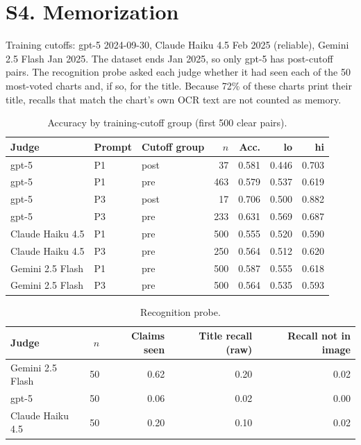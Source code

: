 \documentclass[10pt]{article}
\begin{document}
\section*{S4. Memorization}
Training cutoffs: gpt-5 2024-09-30, Claude Haiku 4.5 Feb 2025 (reliable), Gemini 2.5 Flash Jan 2025. The dataset ends Jan 2025, so only gpt-5 has post-cutoff pairs. The recognition probe asked each judge whether it had seen each of the 50 most-voted charts and, if so, for the title. Because 72\% of these charts print their title, recalls that match the chart's own OCR text are not counted as memory.

\begin{table}[h]\centering\small
\caption{Accuracy by training-cutoff group (first 500 clear pairs).}
\begin{tabular}{lllrrrr}
\toprule
Judge & Prompt & Cutoff group & $n$ & Acc. & lo & hi \\
\midrule
gpt-5 & P1 & post & 37 & 0.581 & 0.446 & 0.703 \\
gpt-5 & P1 & pre & 463 & 0.579 & 0.537 & 0.619 \\
gpt-5 & P3 & post & 17 & 0.706 & 0.500 & 0.882 \\
gpt-5 & P3 & pre & 233 & 0.631 & 0.569 & 0.687 \\
Claude Haiku 4.5 & P1 & pre & 500 & 0.555 & 0.520 & 0.590 \\
Claude Haiku 4.5 & P3 & pre & 250 & 0.564 & 0.512 & 0.620 \\
Gemini 2.5 Flash & P1 & pre & 500 & 0.587 & 0.555 & 0.618 \\
Gemini 2.5 Flash & P3 & pre & 500 & 0.564 & 0.535 & 0.593 \\
\bottomrule
\end{tabular}
\end{table}

\begin{table}[h]\centering\small
\caption{Recognition probe.}
\begin{tabular}{lrrrr}
\toprule
Judge & $n$ & Claims seen & Title recall (raw) & Recall not in image \\
\midrule
Gemini 2.5 Flash & 50 & 0.62 & 0.20 & 0.02 \\
gpt-5 & 50 & 0.06 & 0.02 & 0.00 \\
Claude Haiku 4.5 & 50 & 0.20 & 0.10 & 0.02 \\
\bottomrule
\end{tabular}
\end{table}
\end{document}
